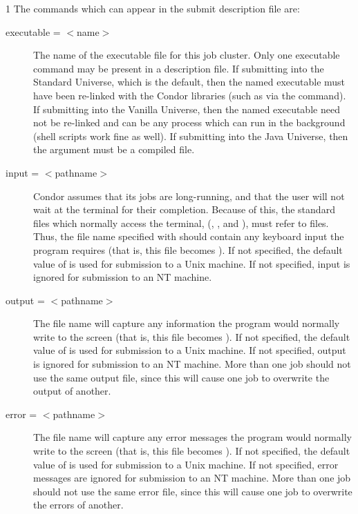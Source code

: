 \begin{ManPage}{\label{man-condor-submit}}{1}
The commands which can appear in the submit description file are:

\begin{description} 


\item[executable = $<$name$>$]
The name of the executable file for this
job cluster. Only one executable command may be present in a description
file. If submitting into the Standard Universe, which is the default,
then the named executable must have been re-linked with the Condor
libraries (such as via the  command). If submitting into
the Vanilla Universe, then the named executable need not be re-linked and
can be any process which can run in the background (shell scripts work
fine as well).  If submitting into the Java Universe, then the argument
must be a compiled  file.



\item[input = $<$pathname$>$]
Condor assumes that its jobs are
long-running, and that the user will not wait at the terminal for their
completion. Because of this, the standard files which normally access
the terminal, (, , and ),
must refer to files. Thus,
the file name specified with  should contain any keyboard
input the program requires (that is, this file becomes ).
If not specified, the default value
of  is used for submission to a Unix machine.
If not specified, input is ignored
for submission to an NT machine.


\item[output = $<$pathname$>$]
The  file name will capture
any information the program would normally write to the screen
(that is, this file becomes ).
If not specified, the default value of
 is used for submission to a Unix machine.
If not specified, output is ignored
for submission to an NT machine.
More than one job should not use the same output
file, since this will cause one job to overwrite the output of
another.


\item[error = $<$pathname$>$]
The  file name will capture any
error messages the program would normally write to the screen
(that is, this file becomes ).
If not specified, the default value of
 is used for submission to a Unix machine.
If not specified, error messages are ignored
for submission to an NT machine.
More than one job should not use the same error file, since
this will cause one job to overwrite the errors of another.


\end{description}
\end{ManPage}
